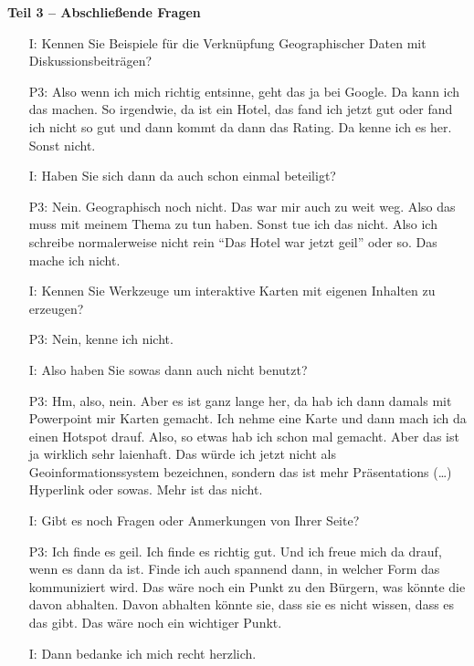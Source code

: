 \textbf{Teil 3 -- Abschlie{\ss}ende Fragen}
\begin{itemize}
    \item[I:] Kennen Sie Beispiele f{\"u}r die Verkn{\"u}pfung Geographischer Daten mit Diskussionsbeitr{\"a}gen?
    \item[P3:] Also wenn ich mich richtig entsinne, geht das ja bei Google. Da kann ich das machen. So irgendwie, da ist ein Hotel, das fand ich jetzt gut oder fand ich nicht so gut und dann kommt da dann das Rating. Da kenne ich es her. Sonst nicht.
    \item[I:] Haben Sie sich dann da auch schon einmal beteiligt?
    \item[P3:] Nein. Geographisch noch nicht. Das war mir auch zu weit weg. Also das muss mit meinem Thema zu tun haben. Sonst tue ich das nicht. Also ich schreibe normalerweise nicht rein "`Das Hotel war jetzt geil"' oder so. Das mache ich nicht.
    \item[I:] Kennen Sie Werkzeuge um interaktive Karten mit eigenen Inhalten zu erzeugen?
    \item[P3:] Nein, kenne ich nicht.
    \item[I:] Also haben Sie sowas dann auch nicht benutzt?
    \item[P3:] Hm, also, nein. Aber es ist ganz lange her, da hab ich dann damals mit Powerpoint mir Karten gemacht. Ich nehme eine Karte und dann mach ich da einen Hotspot drauf. Also, so etwas hab ich schon mal gemacht. Aber das ist ja wirklich sehr laienhaft. Das w{\"u}rde ich jetzt nicht als Geoinformationssystem bezeichnen, sondern das ist mehr Pr{\"a}sentations (\dots) Hyperlink oder sowas. Mehr ist das nicht.
    \item[I:] Gibt es noch Fragen oder Anmerkungen von Ihrer Seite?
    \item[P3:] Ich finde es geil. Ich finde es richtig gut. Und ich freue mich da drauf, wenn es dann da ist. Finde ich auch spannend dann, in welcher Form das kommuniziert wird. Das w{\"a}re noch ein Punkt zu den B{\"u}rgern, was k{\"o}nnte die davon abhalten. Davon abhalten k{\"o}nnte sie, dass sie es nicht wissen, dass es das gibt. Das w{\"a}re noch ein wichtiger Punkt.
    \item[I:] Dann bedanke ich mich recht herzlich.
\end{itemize}